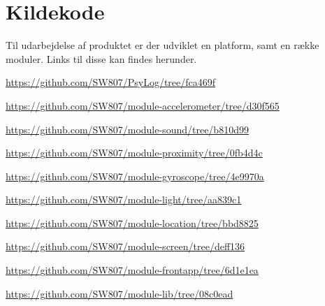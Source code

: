 \chapter{Kildekode}\label{app:kode}
Til udarbejdelse af produktet er der udviklet en platform, samt en række moduler.
Links til disse kan findes herunder.

\begin{description}[style=nextline]
	\item[PsyLog] \url{https://github.com/SW807/PsyLog/tree/fca469f}
	\item[module-accelerometer] \url{https://github.com/SW807/module-accelerometer/tree/d30f565}
	\item[module-sound] \url{https://github.com/SW807/module-sound/tree/b810d99}
	\item[module-proximity] \url{https://github.com/SW807/module-proximity/tree/0fb4d4c}
	\item[module-gyroscope] \url{https://github.com/SW807/module-gyroscope/tree/4e9970a}
	\item[module-light] \url{https://github.com/SW807/module-light/tree/aa839c1}
	\item[module-location] \url{https://github.com/SW807/module-location/tree/bbd8825}
	\item[module-screen] \url{https://github.com/SW807/module-screen/tree/deff136}
	\item[module-frontapp] \url{https://github.com/SW807/module-frontapp/tree/6d1e1ea}
	\item[module-lib] \url{https://github.com/SW807/module-lib/tree/08c0ead}
\end{description}